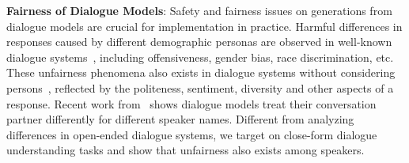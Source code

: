 







\textbf{Fairness of Dialogue Models}: 
Safety and fairness issues on generations from dialogue models are crucial for implementation in practice. Harmful differences in responses caused by different demographic personas are observed in well-known dialogue systems~\cite{sheng2021revealing,dinan2020queens}, including offensiveness, gender bias, race discrimination, etc. These unfairness phenomena also exists in dialogue systems without considering persons~\cite{liu2020does}, reflected by the politeness, sentiment, diversity and other aspects of a response. Recent work from~\cite{smith2021hi} shows dialogue models treat their conversation partner differently for different speaker names. Different from analyzing differences in open-ended dialogue systems, we target on close-form dialogue understanding tasks and show that unfairness also exists among speakers.





